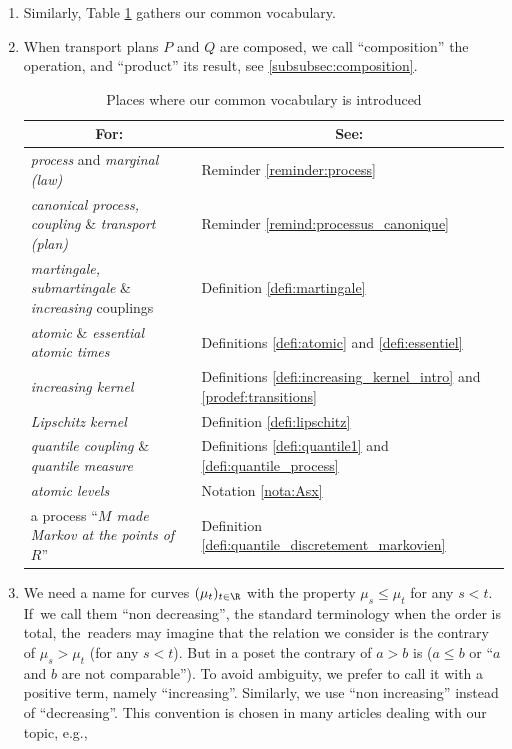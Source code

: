 \skpt
\begin{vocabulary}
\begin{enumerate}
\item
Similarly, Table \ref{table:vocabulary} gathers our common vocabulary.

\item
When transport plans $P$ and $Q$ are composed, we call ``composition'' the oper\-a\-tion, and ``product'' its result, see \ref{subsubsec:composition}.
\begin{table}[htb]
\small\hspace*{\fill}\begin{tabular}{l|l}
\multicolumn{1}{c|}{For:}&\multicolumn{1}{c}{See:}\\\hline
\emph{process} and \emph{marginal (law)} & Reminder \ref{reminder:process}\\
\emph{canonical process, coupling} \& \emph{transport (plan)} & Reminder \ref{remind:processus_canonique}\\
\emph{martingale, submartingale} \& \emph{increasing} couplings
& Definition \ref{defi:martingale}\\
\emph{atomic} \& \emph{essential atomic times} & Definitions \ref{defi:atomic} and \ref{defi:essentiel}\\
\emph{increasing kernel} & Definitions \ref{defi:increasing_kernel_intro} and \ref{prodef:transitions}\\
\emph{Lipschitz kernel} & Definition \ref{defi:lipschitz}\\
\emph{quantile coupling} \& \emph{quantile measure} & Definitions \ref{defi:quantile1} and \ref{defi:quantile_process}\\
\emph{atomic levels} & Notation \ref{nota:Asx}\\
a process ``\emph{$M$ made Markov at the points of $R$}'' & Definition \ref{defi:quantile_discretement_markovien}\\
\end{tabular}\hspace*{\fill}\hspace*{\fill}\normalsize
\vspace*{.5\baselineskip}
\caption{\label{table:vocabulary}Places where our common vocabulary is introduced}
\end{table}

\item
We need a name for curves $(\mu_t)_{t\in\R}$ with the property $\mu_s\leqslant \mu_t$ for any \hbox{$s<t$}. If~we call them ``non decreasing'', the standard terminology when the order is total, the~readers may imagine that the relation we consider is the contrary of $\mu_s>\mu_t$ (for any $s<t$). But in a poset the contrary of $a>b$ is ($a\leq b$ or ``$a$ and $b$ are not comparable''). To avoid ambiguity, we prefer to call it with a positive term, namely ``increasing''. Similarly, we use ``non increasing'' instead of ``decreasing''. This convention is chosen in many articles dealing with our topic, e.g., \cite{SS,KaKr,Low2,HiRoYo14}
\end{enumerate}
\end{vocabulary}


